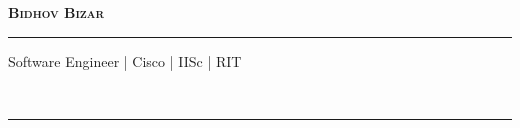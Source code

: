 \documentclass[1pt]{article}
\newcommand{\makeheading}[1]%
        {\hspace*{-\marginparsep minus \marginparwidth}%
         \begin{minipage}[t]{\textwidth+\marginparwidth+\marginparsep}%
                {\large \bfseries #1}\\[-0.15\baselineskip]%
                 \rule{\columnwidth}{1pt}%
         \end{minipage}}
\renewcommand{\section}[2]%
        {\pagebreak[2]\vspace{0.7\baselineskip}%
         \phantomsection\addcontentsline{toc}{section}{#1}%
         \hspace{0in}%
         \marginpar{
         \raggedright \scshape #1}#2}
\begin{document}
\makeheading{\huge \textsc{Bidhov Bizar} \\
\rule{\textwidth}{1pt}
\large Software Engineer | Cisco | IISc | RIT}

%
%
\end{document}
